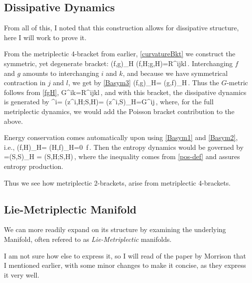 \subsection{Dissipative Dynamics}

From all of this, I noted that this construction allows for dissipative structure, here I will work to prove it.

From  the metriplectic 4-bracket from earlier, \eqref{curvatureBkt} we construct the symmetric, yet degenerate bracket:
\bq
(f,g)_H \coloneqq (f,H;g,H)=R^{ijkl}\,.
\label{fgH}
\eq
Interchanging $f$ and $g$ amounts to interchanging $i$ and $k$, and because we have symmetrical contraction in $j$ and $l$, we get by \eqref{Basym3}
\bq
(f,g)_H= (g,f)_H\,.
\eq
Thus  the $G$-metric follows from \eqref{fgH},
\bq
G^{ik}=R^{ijkl}\,,
\eq
and with this bracket, the dissipative dynamics is generated by
\bq
{}^i= (z^i,H;S,H)= (z^i,S)_H=G^{ij}\,,
\eq
where, for the full metriplectic dynamics, we would add the Poisson bracket contribution to the above.


Energy conservation comes automatically upon using \eqref{Basym1} and \eqref{Basym2}, i.e.,
\bq
(f,H)_H= (H,f)_H=0\qquad \forall\, f\,.
\eq
Then the entropy dynamics would be governed by
\bq
{} =(S,S)_H = (S,H;S,H)\,,
\label{entropy}
\eq
where the inequality comes from \eqref{pos-def} and assures entropy production.


Thus we see how  metriplectic 2-brackets, arise from metriplectic 4-brackets.


\subsection{Lie-Metriplectic Manifold}
We can more readily expand on its structure by examining the underlying Manifold, often refered to as \emph{Lie-Metriplectic} manifolds.

I am not sure how else to express it, so I will read of the paper by Morrison that I mentioned earlier, with some minor changes to make it concise, as they express it very well.


